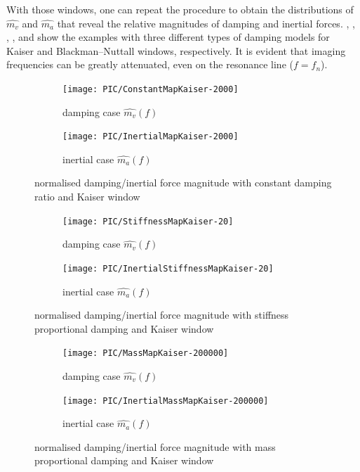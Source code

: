 With those windows, one can repeat the procedure to obtain the distributions of $\hat{m_v}$ and $\hat{m_a}$ that reveal the relative magnitudes of damping and inertial forces. , , , ,  and  show the examples with three different types of damping models for Kaiser and Blackman--Nuttall windows, respectively. It is evident that imaging frequencies can be greatly attenuated, even on the resonance line ($f=f_n$).
\begin{figure}[htb!]
\centering
\begin{subfigure}{.48\textwidth}
\texttt{[image: PIC/ConstantMapKaiser-2000]}
\caption{damping case $\hat{m_v}\left(f\right)$}
\end{subfigure}
\begin{subfigure}{.48\textwidth}
\texttt{[image: PIC/InertialMapKaiser-2000]}
\caption{inertial case $\hat{m_a}\left(f\right)$}
\end{subfigure}
\caption{normalised damping/inertial force magnitude with constant damping ratio and Kaiser window}\label{fig:map_constant_kaiser}
\end{figure}
\begin{figure}[htb!]
\centering
\begin{subfigure}{.48\textwidth}
\texttt{[image: PIC/StiffnessMapKaiser-20]}
\caption{damping case $\hat{m_v}\left(f\right)$}
\end{subfigure}
\begin{subfigure}{.48\textwidth}
\texttt{[image: PIC/InertialStiffnessMapKaiser-20]}
\caption{inertial case $\hat{m_a}\left(f\right)$}
\end{subfigure}
\caption{normalised damping/inertial force magnitude with stiffness proportional damping and Kaiser window}\label{fig:map_stiffness_kaiser}
\end{figure}
\begin{figure}[htb!]
\centering
\begin{subfigure}{.48\textwidth}
\texttt{[image: PIC/MassMapKaiser-200000]}
\caption{damping case $\hat{m_v}\left(f\right)$}
\end{subfigure}
\begin{subfigure}{.48\textwidth}
\texttt{[image: PIC/InertialMassMapKaiser-200000]}
\caption{inertial case $\hat{m_a}\left(f\right)$}
\end{subfigure}
\caption{normalised damping/inertial force magnitude with mass proportional damping and Kaiser window}\label{fig:map_mass_kaiser}
\end{figure}
